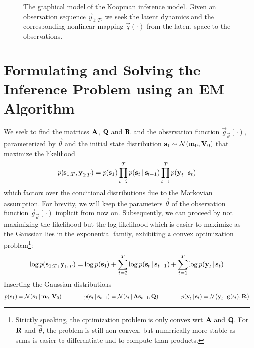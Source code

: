 \begin{figure}
	\centering
	\tikzNonlinearGaussianKoopman
	\caption{The graphical model of the Koopman inference model. Given an observation sequence \( \vec{y}_{1:T} \), we seek the latent dynamics and the corresponding nonlinear mapping \( \vec{g}(\cdot) \) from the latent space to the observations.}
	\label{fig:nonlinearGaussianKoopman}
\end{figure}

\section{Formulating and Solving the Inference Problem using an EM Algorithm}
	We seek to find the matrices \(\boldsymbol{\mathrm{A}}\), \(\boldsymbol{\mathrm{Q}}\) and \(\boldsymbol{\mathrm{R}}\) and the observation function \( \vec{g}_{\vec{\theta}}(\cdot) \), parameterized by \(\vec{\theta}\) and the initial state distribution \( \boldsymbol{\mathrm{s}}_1 \sim \mathcal{N}(\boldsymbol{\mathrm{m}}_0, \boldsymbol{\mathrm{V}}_0) \) that maximize the likelihood
	\begin{equation*}
		p(\boldsymbol{\mathrm{s}}_{1:T}, \boldsymbol{\mathrm{y}}_{1:T}) = p(\boldsymbol{\mathrm{s}}_1) \prod_{t = 2}^{T} p(\boldsymbol{\mathrm{s}}_t \,\vert\, \boldsymbol{\mathrm{s}}_{t - 1}) \prod_{t = 1}^{T} p(\boldsymbol{\mathrm{y}}_t \,\vert\, \boldsymbol{\mathrm{s}}_t)
	\end{equation*}
	which factors over the conditional distributions due to the Markovian assumption. For brevity, we will keep the parameters \( \vec{\theta} \) of the observation function \( \vec{g}_{\vec{\theta}}(\cdot) \) implicit from now on. Subsequently, we can proceed by not maximizing the likelihood but the log-likelihood which is easier to maximize as the Gaussian lies in the exponential family, exhibiting a convex optimization problem\footnote{Strictly speaking, the optimization problem is only convex \ac{wrt} \(\boldsymbol{\mathrm{A}}\) and \(\boldsymbol{\mathrm{Q}}\). For \(\boldsymbol{\mathrm{R}}\) and \(\vec{\theta}\), the problem is still non-convex, but numerically more stable as sums is easier to differentiate and to compute than products.}:
	\begin{equation*}
		\log p(\boldsymbol{\mathrm{s}}_{1:T}, \boldsymbol{\mathrm{y}}_{1:T}) = \log p(\boldsymbol{\mathrm{s}}_1) + \sum_{t = 2}^{T} \log p(\boldsymbol{\mathrm{s}}_t \,\vert\, \boldsymbol{\mathrm{s}}_{t - 1}) + \sum_{t = 1}^{T} \log p(\boldsymbol{\mathrm{y}}_t \,\vert\, \boldsymbol{\mathrm{s}}_t)
	\end{equation*}
	Inserting the Gaussian distributions
	\begin{equation*}
		p(\boldsymbol{\mathrm{s}}_1) = \mathcal{N}(\boldsymbol{\mathrm{s}}_1 \,\vert\, \boldsymbol{\mathrm{m}}_0, \boldsymbol{\mathrm{V}}_0) \qquad\qquad
		p(\boldsymbol{\mathrm{s}}_t \,\vert\, \boldsymbol{\mathrm{s}}_{t - 1}) = \mathcal{N}(\boldsymbol{\mathrm{s}}_t \,\vert\, \boldsymbol{\mathrm{A}} \boldsymbol{\mathrm{s}}_{t - 1}, \boldsymbol{\mathrm{Q}}) \qquad\qquad
		p(\boldsymbol{\mathrm{y}}_t \,\vert\, \boldsymbol{\mathrm{s}}_t) = \mathcal{N}\big(\boldsymbol{\mathrm{y}}_t \,\vert\, \boldsymbol{\mathrm{g}}(\boldsymbol{\mathrm{s}}_t), \boldsymbol{\mathrm{R}}\big)
	\end{equation*}
